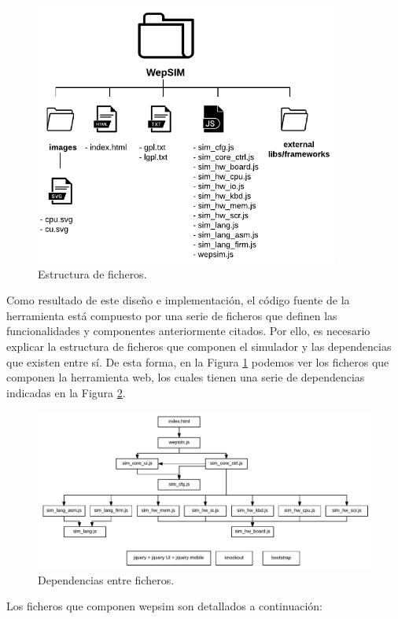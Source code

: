 \begin{figure}[htbp]
 	\centering
 	\includegraphics[width=10cm]{figures/folder_diagram}
 	\caption{Estructura de ficheros.}
	\label{fig:folder_structure}
\end{figure}

Como resultado de este diseño e implementación, el código fuente de la herramienta está compuesto por una serie de ficheros que definen las funcionalidades y componentes anteriormente citados. Por ello, es necesario explicar la estructura de ficheros que componen el simulador y las dependencias que existen entre sí. De esta forma, en la Figura \ref{fig:folder_structure} podemos ver los ficheros que componen la herramienta web, los cuales tienen una serie de dependencias indicadas en la Figura \ref{fig:files_dependencies}.

\begin{figure}[htbp]
 	\centering
 	\includegraphics[width=15.5cm]{figures/dependencies_diagram}
 	\caption{Dependencias entre ficheros.}
	\label{fig:files_dependencies}
\end{figure}

Los ficheros que componen \acrshort{wepsim} son detallados a continuación:

